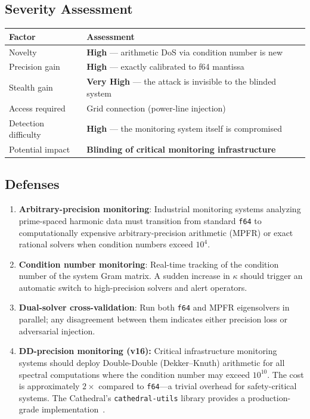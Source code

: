 \documentclass[11pt,a4paper]{article}
\begin{document}
\subsection{Severity Assessment}

\begin{center}
\begin{tabular}{@{}ll@{}}
\toprule
\textbf{Factor} & \textbf{Assessment} \\
\midrule
Novelty & \textbf{High} --- arithmetic DoS via condition number is new \\
Precision gain & \textbf{High} --- exactly calibrated to f64 mantissa \\
Stealth gain & \textbf{Very High} --- the attack is invisible to the blinded system \\
Access required & Grid connection (power-line injection) \\
Detection difficulty & \textbf{High} --- the monitoring system itself is compromised \\
Potential impact & \textbf{Blinding of critical monitoring infrastructure} \\
\bottomrule
\end{tabular}
\end{center}

\subsection{Defenses}

\begin{enumerate}
  \item \textbf{Arbitrary-precision monitoring}: Industrial monitoring
    systems analyzing prime-spaced harmonic data must transition from
    standard \texttt{f64} to computationally expensive arbitrary-precision
    arithmetic (MPFR) or exact rational solvers when condition numbers
    exceed $10^4$.
  \item \textbf{Condition number monitoring}: Real-time tracking of
    the condition number of the system Gram matrix. A sudden increase
    in $\kappa$ should trigger an automatic switch to high-precision
    solvers and alert operators.
  \item \textbf{Dual-solver cross-validation}: Run both \texttt{f64}
    and MPFR eigensolvers in parallel; any disagreement between them
    indicates either precision loss or adversarial injection.
  \item \textbf{DD-precision monitoring (v16):} Critical infrastructure
    monitoring systems should deploy Double-Double (Dekker--Knuth)
    arithmetic for all spectral computations where the condition number
    may exceed $10^{10}$. The cost is approximately $2\times$ compared
    to \texttt{f64}---a trivial overhead for safety-critical systems.
    The Cathedral's \texttt{cathedral-utils} library provides a
    production-grade implementation~\cite{dekker1971}.
\end{enumerate}
\end{document}
